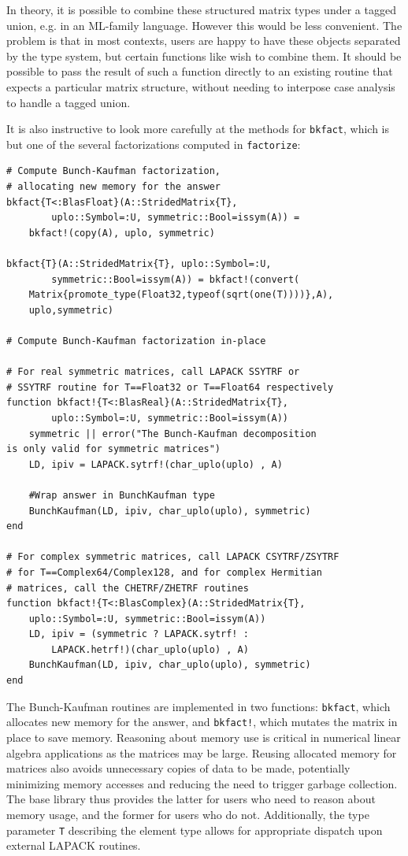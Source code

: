 \documentclass[pldi]{sigplanconf-pldi15}
\begin{document}
In theory, it is possible to combine these structured matrix types under a
tagged union, e.g. in an ML-family language. However this would be
less convenient. The problem is that in most contexts,
users are happy to have these objects separated by the type system, but
certain functions like  wish to combine them. It should be
possible to pass the result of such a function directly to an existing
routine that expects a particular matrix structure, without needing to
interpose case analysis to handle a tagged union.

It is also instructive to look more carefully at the methods for \verb|bkfact|,
which is but one of the several factorizations computed in \verb|factorize|:

\begin{lstlisting}
# Compute Bunch-Kaufman factorization,
# allocating new memory for the answer
bkfact{T<:BlasFloat}(A::StridedMatrix{T},
        uplo::Symbol=:U, symmetric::Bool=issym(A)) =
    bkfact!(copy(A), uplo, symmetric)

bkfact{T}(A::StridedMatrix{T}, uplo::Symbol=:U,
        symmetric::Bool=issym(A)) = bkfact!(convert(
    Matrix{promote_type(Float32,typeof(sqrt(one(T))))},A),
    uplo,symmetric)

# Compute Bunch-Kaufman factorization in-place

# For real symmetric matrices, call LAPACK SSYTRF or
# SSYTRF routine for T==Float32 or T==Float64 respectively
function bkfact!{T<:BlasReal}(A::StridedMatrix{T},
        uplo::Symbol=:U, symmetric::Bool=issym(A))
    symmetric || error("The Bunch-Kaufman decomposition
is only valid for symmetric matrices")
    LD, ipiv = LAPACK.sytrf!(char_uplo(uplo) , A)

    #Wrap answer in BunchKaufman type
    BunchKaufman(LD, ipiv, char_uplo(uplo), symmetric)
end

# For complex symmetric matrices, call LAPACK CSYTRF/ZSYTRF
# for T==Complex64/Complex128, and for complex Hermitian
# matrices, call the CHETRF/ZHETRF routines 
function bkfact!{T<:BlasComplex}(A::StridedMatrix{T},
	uplo::Symbol=:U, symmetric::Bool=issym(A))
    LD, ipiv = (symmetric ? LAPACK.sytrf! :
        LAPACK.hetrf!)(char_uplo(uplo) , A)
    BunchKaufman(LD, ipiv, char_uplo(uplo), symmetric)
end
\end{lstlisting}

The Bunch-Kaufman routines are implemented in two functions: \verb|bkfact|,
which allocates new memory for the answer, and \verb|bkfact!|, which mutates
the matrix in place to save memory. Reasoning about memory use is critical in
numerical linear algebra applications as the matrices may be large.
Reusing allocated memory for matrices also avoids unnecessary copies of data to
be made, potentially minimizing memory accesses and reducing the need to
trigger garbage collection. The base library thus provides the latter for users
who need to reason about memory usage, and the former for users who do not.
Additionally, the type parameter \verb|T| describing the element type allows
for appropriate dispatch upon external LAPACK routines.
\end{document}
